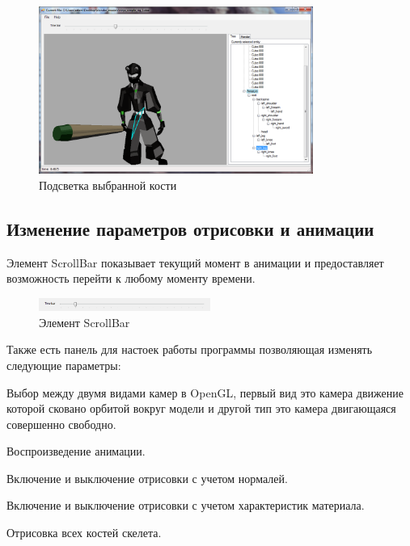 \begin{figure}[h!]
    \centering
    \includegraphics[width=0.8\textwidth]{../screenshots/frame_with_one_bone.png}
    \caption{Подсветка выбранной кости}
\end{figure}


\subsection{Изменение параметров отрисовки и анимации}
Элемент ScrollBar показывает текущий момент в анимации и предоставляет 
возможность перейти к любому моменту времени. 

\begin{figure}[h!]
    \centering
    \includegraphics[width=0.5\textwidth]{../screenshots/time_bar.png}
    \caption{Элемент ScrollBar}
\end{figure}

Также есть панель для настоек работы программы позволяющая изменять следующие параметры:
\begin{my_enumerate}
\item Выбор между двумя видами камер в OpenGL, первый вид это камера движение которой сковано орбитой вокруг модели и другой тип это камера двигающаяся совершенно свободно.
\item Воспроизведение анимации.
\item Включение и выключение отрисовки с учетом нормалей.
\item Включение и выключение отрисовки с учетом характеристик материала.
\item Отрисовка всех костей скелета.
\end{my_enumerate}


